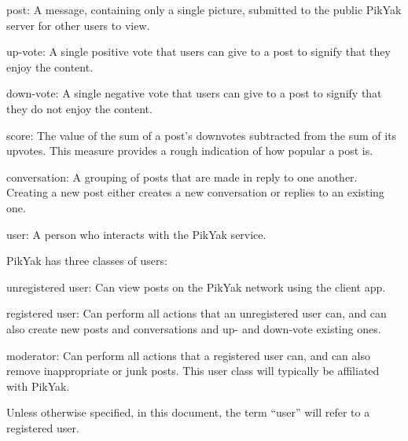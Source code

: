 \documentclass[11pt]{scrartcl}
\begin{document}
        \begin{description*}
            \item[post:] A message, containing only a single picture, submitted to the public PikYak server for other users to view.

            \item[up-vote:] A single positive vote that users can give to a post to signify that they enjoy the content.

            \item[down-vote:] A single negative vote that users can give to a post to signify that they do not enjoy the content.

            \item[score:] The value of the sum of a post's downvotes subtracted from the sum of its upvotes.
                          This measure provides a rough indication of how popular a post is.

            \item[conversation:] A grouping of posts that are made in reply to one another.
                                 Creating a new post either creates a new conversation or replies to an existing one.

            \item[user:] A person who interacts with the PikYak service.

                         PikYak has three classes of users:

                         \begin{description*}
                             \item[unregistered user:] Can view posts on the PikYak network using the client app.
                             \item[registered user:] Can perform all actions that an unregistered user can, and can also create new posts and conversations and up- and down-vote existing ones.
                             \item[moderator:] Can perform all actions that a registered user can, and can also remove inappropriate or junk posts.  This user class will typically be affiliated with PikYak.
                         \end{description*}

                         Unless otherwise specified, in this document, the term ``user'' will refer to a registered user.
        \end{description*}
\end{document}
